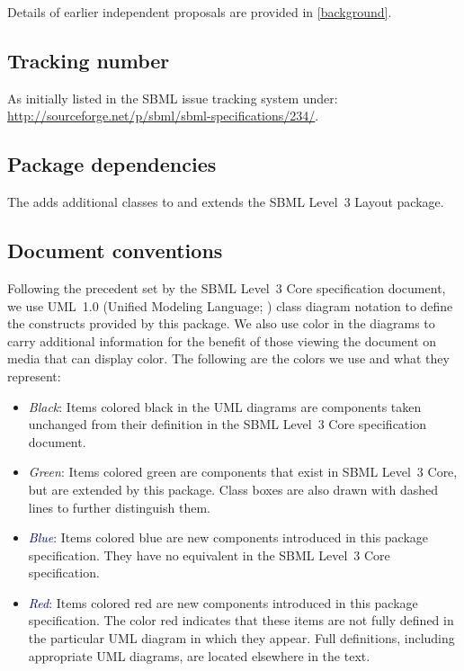 Details of earlier independent proposals are provided 
in \ref{background}. 

\subsection{Tracking number} 
As initially listed in the SBML issue tracking system under:\\ 
\url{http://sourceforge.net/p/sbml/sbml-specifications/234/}. 

\subsection{Package dependencies} 

The \RenderPackage adds additional classes to \sbmlthreecore and extends the 
SBML Level~3 Layout package. 

\subsection{Document conventions} \label{conventions} 

Following the precedent set by the SBML Level~3 Core specification 
document, we use UML~1.0 (Unified Modeling Language; 
\citealt{eriksson:1998,oestereich:1999}) class diagram notation to 
define the constructs provided by this package. We also use color in the 
diagrams to carry additional information for the benefit of those 
viewing the document on media that can display color. The following are 
the colors we use and what they represent: 

\begin{itemize} 

\item[\raisebox{2.75pt}{\colorbox{black}{\rule{0.8pt}{0.8pt}}}] 
\emph{Black}: Items colored black in the UML diagrams are components 
taken unchanged from their definition in the SBML Level~3 Core 
specification document. 

\item[\raisebox{2.75pt}{\colorbox{mediumgreen}{\rule{0.8pt}{0.8pt}}}] 
\emph{\textcolor{mediumgreen}{Green}}: Items colored green are 
components that exist in SBML Level~3 Core, but are extended by this 
package. Class boxes are also drawn with dashed lines to further 
distinguish them. 

\item[\raisebox{2.75pt}{\colorbox{darkblue}{\rule{0.8pt}{0.8pt}}}] 
\emph{\textcolor{darkblue}{Blue}}: Items colored blue are new components 
introduced in this package specification. They have no equivalent in the 
SBML Level~3 Core specification. 

\item[\raisebox{2.75pt}{\colorbox{red}{\rule{0.8pt}{0.8pt}}}] 
\emph{\textcolor{darkblue}{Red}}: Items colored red are new components 
introduced in this package specification. The color red indicates that these items are not fully defined in the particular UML diagram in which they appear. Full definitions, including appropriate UML diagrams, are located elsewhere in the text.
\end{itemize} 

